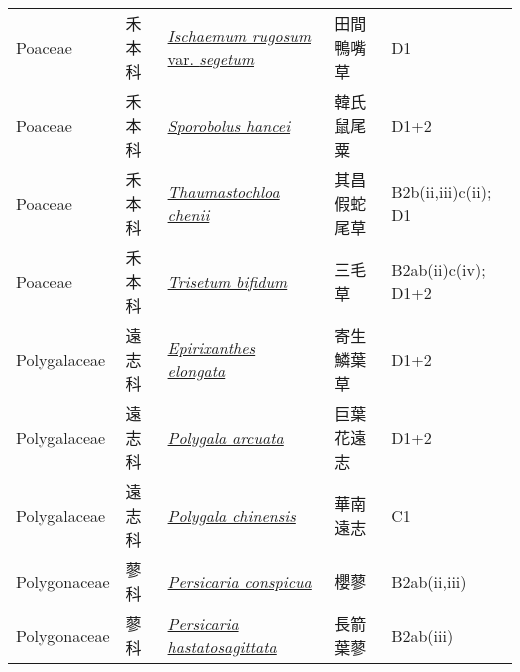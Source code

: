 {\begin{longtable}{L{2.5cm}L{2cm}L{5cm}L{2.5cm}L{3cm}}
    Poaceae & 禾本科 & \href{http://www.theplantlist.org/tpl1.1/search?q=Ischaemum+rugosum+var.+segetum}{\textit{Ischaemum rugosum} var. \textit{segetum} } & 田間鴨嘴草 & D1    \\
    Poaceae & 禾本科 & \href{http://www.theplantlist.org/tpl1.1/search?q=Sporobolus+hancei}{\textit{Sporobolus hancei} } & 韓氏鼠尾粟 & D1+2    \\
    Poaceae & 禾本科 & \href{http://www.theplantlist.org/tpl1.1/search?q=Thaumastochloa+chenii}{\textit{Thaumastochloa chenii} } & 其昌假蛇尾草 & B2b(ii,iii)c(ii); D1    \\
    Poaceae & 禾本科 & \href{http://www.theplantlist.org/tpl1.1/search?q=Trisetum+bifidum}{\textit{Trisetum bifidum} } & 三毛草 & B2ab(ii)c(iv); D1+2    \\
    Polygalaceae & 遠志科 & \href{http://www.theplantlist.org/tpl1.1/search?q=Epirixanthes+elongata}{\textit{Epirixanthes elongata} } & 寄生鱗葉草 & D1+2    \\
    Polygalaceae & 遠志科 & \href{http://www.theplantlist.org/tpl1.1/search?q=Polygala+arcuata}{\textit{Polygala arcuata} } & 巨葉花遠志 & D1+2    \\
    Polygalaceae & 遠志科 & \href{http://www.theplantlist.org/tpl1.1/search?q=Polygala+chinensis}{\textit{Polygala chinensis} } & 華南遠志 & C1    \\
    Polygonaceae & 蓼科 & \href{http://www.theplantlist.org/tpl1.1/search?q=Persicaria+conspicua}{\textit{Persicaria conspicua} } & 櫻蓼 & B2ab(ii,iii)    \\
    Polygonaceae & 蓼科 & \href{http://www.theplantlist.org/tpl1.1/search?q=Persicaria+hastatosagittata}{\textit{Persicaria hastatosagittata} } & 長箭葉蓼 & B2ab(iii)    \\

\end{longtable}}
